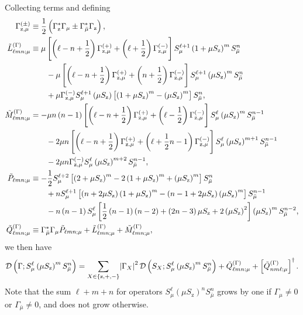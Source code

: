 \documentclass[aps,notitlepage,nofootinbib,11pt]{revtex4-1}
\newcommand{\f}[2]{\dfrac{#1}{#2}} %
\newcommand{\p}[1]{\left(#1\right)} %
\renewcommand{\sp}[1]{\left[#1\right]} %
\renewcommand{\set}[1]{\left\{#1\right\}} %
\newcommand{\D}{\mathcal{D}}
\newcommand{\z}{\text{z}}
\newcommand{\bmu}{{\bar\mu}}
\newcommand{\1}{\mathds{1}}
\begin{document}
Collecting terms and defining
\begin{align}
  \Gamma_{\z,\mu}^{(\pm)}
  &\equiv \f12\p{\Gamma_\z^* \Gamma_\mu \pm \Gamma_\bmu^* \Gamma_\z},
  \allowdisplaybreaks \\
  \tilde L_{\ell mn;\mu}^{(\Gamma)}
  &\equiv \mu \sp{\p{\ell-n+\f12} \Gamma_{\z,\mu}^{(+)}
    + \p{\ell+\f12} \Gamma_{\z,\mu}^{(-)}}
  S_\mu^{\ell+1} \p{1+\mu S_\z}^m S_\bmu^n \notag \\
  &\qquad -\mu \sp{\p{\ell-n+\f12} \Gamma_{\z,\mu}^{(+)}
    + \p{n+\f12} \Gamma_{\z,\mu}^{(-)}}
  S_\mu^{\ell+1} \p{\mu S_\z}^m S_\bmu^n \notag \\
  &\qquad + \mu \Gamma_{\z,\mu}^{(-)}
  S_\mu^{\ell+1} \p{\mu S_\z}
  \sp{\p{1+\mu S_\z}^m - \p{\mu S_\z}^m} S_\bmu^n,
  \allowdisplaybreaks \\
  \tilde M_{\ell mn;\mu}^{(\Gamma)}
  &= -\mu n\p{n-1} \sp{\p{\ell-n+\f12} \Gamma_{\z,\mu}^{(+)}
    + \p{\ell-\f12} \Gamma_{\z,\mu}^{(-)}}
  S_\mu^\ell \p{\mu S_\z}^m S_\bmu^{n-1} \notag \\
  &\qquad - 2\mu n \sp{\p{\ell-n+\f12} \Gamma_{\z,\mu}^{(+)}
    + \p{\ell+\f12n-1} \Gamma_{\z,\mu}^{(-)}}
  S_\mu^\ell \p{\mu S_\z}^{m+1} S_\bmu^{n-1} \notag \\
  &\qquad - 2\mu n \Gamma_{\z,\mu}^{(-)}
  S_\mu^\ell \p{\mu S_\z}^{m+2} S_\bmu^{n-1},
  \allowdisplaybreaks \\
  \tilde P_{\ell mn;\mu}
  &\equiv -\f12 S_\mu^{\ell+2}
  \sp{\p{2+\mu S_\z}^m - 2\p{1+\mu S_\z}^m + \p{\mu S_\z}^m}
  S_\bmu^n \notag \\
  &\qquad + n S_\mu^{\ell+1} \sp{\p{n+2\mu S_\z} \p{1+\mu S_\z}^m
    - \p{n-1+2\mu S_\z} \p{\mu S_\z}^m}
  S_\bmu^{n-1} \notag \\
  &\qquad -n\p{n-1} S_\mu^\ell
  \sp{\f12\p{n-1}\p{n-2} + \p{2n-3}\mu S_\z + 2\p{\mu S_\z}^2}
  \p{\mu S_\z}^m S_\bmu^{n-2},
  \allowdisplaybreaks \\
  \tilde Q_{\ell mn;\mu}^{(\Gamma)}
  &\equiv \Gamma_\bmu^* \Gamma_\mu \tilde P_{\ell mn;\mu}
  + \tilde L_{\ell mn;\mu}^{(\Gamma)}
  + \tilde M_{\ell mn;\mu}^{(\Gamma)},
\end{align}
we then have
\begin{align}
  \D\p{\Gamma; S_\mu^\ell \p{\mu S_\z}^m S_\bmu^n}
  = \sum_{X\in\set{\z,+,-}} \abs{\Gamma_X}^2
  \D\p{S_X; S_\mu^\ell \p{\mu S_\z}^m S_\bmu^n}
  + \tilde Q_{\ell mn;\mu}^{(\Gamma)}
  + \sp{\tilde Q_{nm\ell;\mu}^{(\Gamma)}}^\dag.
\end{align}
Note that the sum $\ell+m+n$ for operators
$S_\mu^\ell \p{\mu S_\z}^n S_\bmu^n$ grows by one if $\Gamma_\mu\ne0$
or $\Gamma_\bmu\ne0$, and does not grow otherwise.
\end{document}
